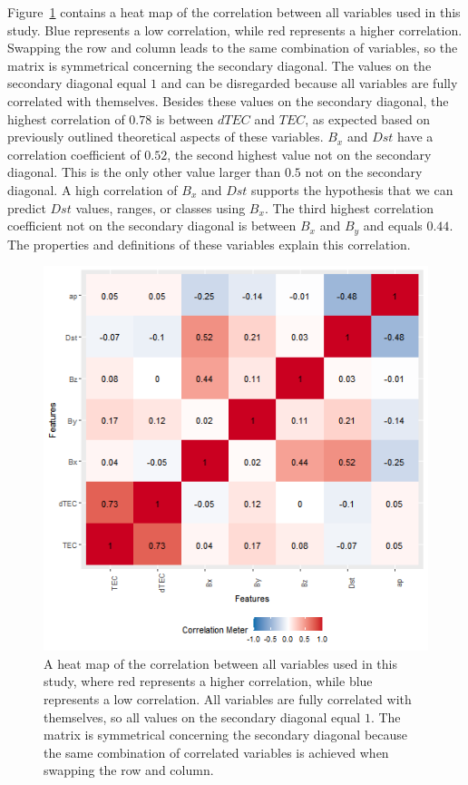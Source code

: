 \documentclass[preprint,12pt]{elsarticle}
\begin{document}
Figure~\ref{fig:correlation} contains a heat map of the correlation between all variables used in this study. Blue represents a low correlation, while red represents a higher correlation. Swapping the row and column leads to the same combination of variables, so the matrix is symmetrical concerning the secondary diagonal. The values on the secondary diagonal equal $1$ and can be disregarded because all variables are fully correlated with themselves. Besides these values on the secondary diagonal, the highest correlation of $0.78$ is between $dTEC$ and $TEC$, as expected based on previously outlined theoretical aspects of these variables. $B_{x}$ and $Dst$ have a correlation coefficient of $0.52$, the second highest value not on the secondary diagonal. This is the only other value larger than $0.5$ not on the secondary diagonal. A high correlation of $B_{x}$ and $Dst$ supports the hypothesis that we can predict $Dst$ values, ranges, or classes using $B_{x}$. The third highest correlation coefficient not on the secondary diagonal is between $B_{x}$ and $B_{y}$ and equals $0.44$. The properties and definitions of these variables explain this correlation.

\begin{figure}
 \centering
 \includegraphics[width=0.9\linewidth]{correlation.png}
    \caption{A heat map of the correlation between all variables used in this study, where red represents a higher correlation, while blue represents a low correlation. All variables are fully correlated with themselves, so all values on the secondary diagonal equal $1$. The matrix is symmetrical concerning the secondary diagonal because the same combination of correlated variables is achieved when swapping the row and column.}
    \label{fig:correlation}
\end{figure}
\end{document}
